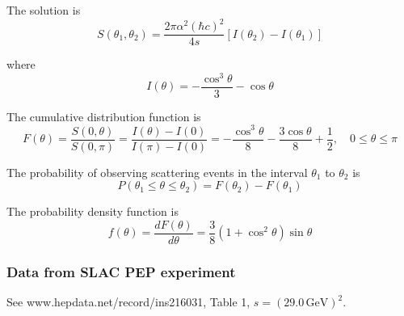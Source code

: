 The solution is
\begin{equation*}
S(\theta_1,\theta_2)=\frac{2\pi\alpha^2(\hbar c)^2}{4s}[I(\theta_2)-I(\theta_1)]
\end{equation*}

where
\begin{equation*}
I(\theta)=-\frac{\cos^3\theta}{3}-\cos\theta
\end{equation*}

The cumulative distribution function is
\begin{equation*}
F(\theta)
=\frac{S(0,\theta)}{S(0,\pi)}
=\frac{I(\theta)-I(0)}{I(\pi)-I(0)}
=-\frac{\cos^3\theta}{8}-\frac{3\cos\theta}{8}+\frac{1}{2},
\quad
0\le\theta\le\pi
\end{equation*}

The probability of observing scattering events in the interval $\theta_1$ to $\theta_2$ is
\begin{equation*}
P(\theta_1\le\theta\le\theta_2)=F(\theta_2)-F(\theta_1)
\end{equation*}

The probability density function is
\begin{equation*}
f(\theta)=\frac{dF(\theta)}{d\theta}
=\frac{3}{8}
\left(1+\cos^2\theta\right)
\sin\theta
\end{equation*}

\subsubsection*{Data from SLAC PEP experiment}

See www.hepdata.net/record/ins216031, Table 1, $s=(29.0\,\text{GeV})^2$.

